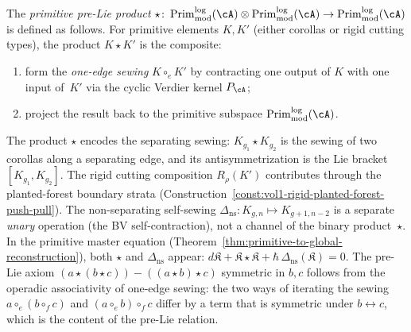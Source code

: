 \begin{definition}
\label{def:primitive-pre-lie-product}
The \emph{primitive pre-Lie product}
$\star \colon \operatorname{Prim}^{\log}_{\mathrm{mod}}(\cA)
\otimes \operatorname{Prim}^{\log}_{\mathrm{mod}}(\cA)
\to \operatorname{Prim}^{\log}_{\mathrm{mod}}(\cA)$
is defined as follows.  For primitive elements $K, K'$
(either corollas or rigid cutting types), the product
$K \star K'$ is the composite:
\begin{enumerate}[label=\textup{(\roman*)}]
\item form the \emph{one-edge sewing} $K \circ_e K'$ by
  contracting one output of $K$ with one input of~$K'$
  via the cyclic Verdier kernel $P_\cA$;
\item project the result back to the primitive subspace
  $\operatorname{Prim}^{\log}_{\mathrm{mod}}(\cA)$.
\end{enumerate}
The product $\star$ encodes the separating sewing:
$K_{g_1} \star K_{g_2}$ is the sewing of two corollas
along a separating edge, and its antisymmetrization is the
Lie bracket $[K_{g_1}, K_{g_2}]$.  The rigid cutting
composition $R_\rho(K')$ contributes through the
planted-forest boundary strata
(Construction~\ref{const:vol1-rigid-planted-forest-push-pull}).
The non-separating self-sewing
$\Delta_{\mathrm{ns}} \colon K_{g,n} \mapsto K_{g+1,n-2}$
is a separate \emph{unary} operation (the BV self-contraction),
not a channel of the binary product~$\star$.  In the primitive
master equation (Theorem~\ref{thm:primitive-to-global-reconstruction}),
both $\star$ and $\Delta_{\mathrm{ns}}$ appear:
$d\mathfrak{K} + \mathfrak{K} \star \mathfrak{K}
+ \hbar\,\Delta_{\mathrm{ns}}(\mathfrak{K}) = 0$.
The pre-Lie axiom
$(a \star (b \star c)) - ((a \star b) \star c)$
symmetric in $b, c$ follows from the operadic associativity
of one-edge sewing: the two ways of iterating the sewing
$a \circ_e (b \circ_f c)$ and $(a \circ_e b) \circ_f c$
differ by a term that is symmetric under $b \leftrightarrow c$,
which is the content of the pre-Lie relation.
\end{definition}

